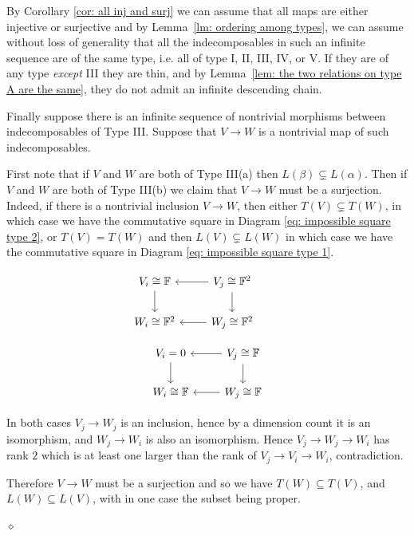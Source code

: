 \documentclass{article}
\newenvironment{proof}{\vspace*{2ex}\noindent {\em Proof:}
}{\hfill $\diamond$ \\[2ex]}
\begin{document}
\begin{proof}
By Corollary \ref{cor: all inj and surj} we can assume that all maps are either injective or surjective and by Lemma~\ref{lm: ordering among types}, we can assume without loss of generality that all the indecomposables in such an infinite sequence are of the same type, i.e. all of type I, II, III, IV, or V.  If they are of any type \emph{except} III they are thin, and by Lemma~\ref{lem: the two relations on type A are the same}, they do not admit an infinite descending chain.

Finally suppose there is an infinite sequence of nontrivial morphisms between indecomposables of Type III. Suppose that $V \to W$ is a nontrivial map of such indecomposables. 

First note that if $V$ and $W$ are both of Type III(a) then $L(\beta) \subsetneq L(\alpha)$. Then if $V$ and $W$ are both of Type III(b) we claim that $V \to W$ must be a surjection. Indeed, if there is a nontrivial inclusion $V \to W$, then either $T(V) \subsetneq T(W)$, in which case we have the commutative square in Diagram \ref{eq: impossible square type 2}, or $T(V) = T(W)$ and then $L(V) \subsetneq L(W)$ in which case we have the commutative square in Diagram \ref{eq: impossible square type 1}.   

\begin{equation}\label{eq: impossible square type 2}
\begin{tikzcd}
V_i \cong \mathbb{F} \arrow[d]  & V_j \cong \mathbb{F}^2 \arrow[l]  \arrow[d] & 
\\ W_i \cong \mathbb{F}^2 & W_j \cong \mathbb{F}^2 \arrow[l] 
\end{tikzcd}
\end{equation}

\begin{equation}\label{eq: impossible square type 1}
\begin{tikzcd}
V_i = 0 \arrow[d] & V_j \cong \mathbb{F} \arrow[l]  \arrow[d] 
\\ W_i \cong \mathbb{F} & W_j \cong \mathbb{F} \arrow[l]
\end{tikzcd}
\end{equation}

In both cases $V_j \to W_j$ is an inclusion, hence by a dimension count it is an isomorphism, and $W_j \to W_i$ is also an isomorphism. Hence $V_j \to W_j \to W_i$ has rank $2$ which is at least one larger than the rank of $V_j \to V_i \to W_i$, contradiction.

Therefore $V \to W$ must be a surjection and so we have $T(W) \subseteq T(V)$, and $L(W) \subseteq L(V)$, with in one case the subset being proper. 


\end{proof}
\end{document}
